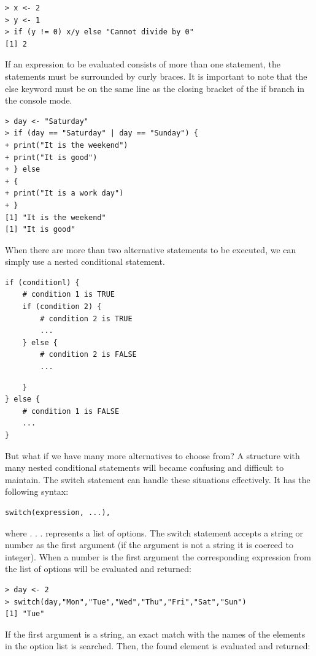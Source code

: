 \documentclass[10pt]{book}
\begin{document}
\begin{verbatim}
> x <- 2
> y <- 1
> if (y != 0) x/y else "Cannot divide by 0"
[1] 2
\end{verbatim}

If an expression to be evaluated consists of more than one statement, the statements must be surrounded by curly braces. It is important to note that the else keyword must be on the same line as the closing bracket of the if branch in the console mode.

\begin{verbatim}
> day <- "Saturday"
> if (day == "Saturday" | day == "Sunday") {
+ print("It is the weekend")
+ print("It is good")
+ } else
+ {
+ print("It is a work day")
+ }
[1] "It is the weekend"
[1] "It is good"
\end{verbatim}

When there are more than two alternative statements to be executed, we can simply use a nested conditional statement.

\begin{verbatim}
if (conditionl) {
    # condition 1 is TRUE
    if (condition 2) {
        # condition 2 is TRUE
        ...
    } else {
        # condition 2 is FALSE
        ...
\end{verbatim}

\begin{verbatim}
    }
} else {
    # condition 1 is FALSE
    ...
}
\end{verbatim}

But what if we have many more alternatives to choose from? A structure with many nested conditional statements will became confusing and difficult to maintain. The switch statement can handle these situations effectively. It has the following syntax:

\begin{verbatim}
switch(expression, ...),
\end{verbatim}

where . . . represents a list of options. The switch statement accepts a string or number as the first argument (if the argument is not a string it is coerced to integer). When a number is the first argument the corresponding expression from the list of options will be evaluated and returned:

\begin{verbatim}
> day <- 2
> switch(day,"Mon","Tue","Wed","Thu","Fri","Sat","Sun")
[1] "Tue"
\end{verbatim}

If the first argument is a string, an exact match with the names of the elements in the option list is searched. Then, the found element is evaluated and returned:
\end{document}
